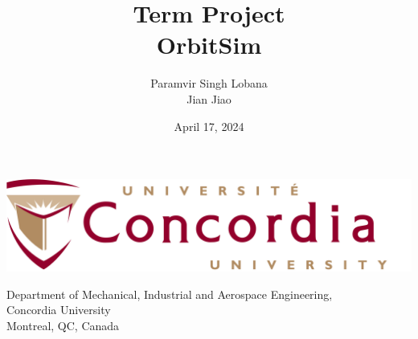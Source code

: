 \begingroup
\let\newpage\relax 
\title{Term Project\\ \Huge{\textbf{OrbitSim}}}
\vspace{200pt}
\date{April 17, 2024}
\maketitle
\thispagestyle{empty}
\endgroup 

\vspace{90pt}
\begin{center}
  \author{\vspace{10pt} Paramvir Singh Lobana \\ Jian Jiao \\ }
\end{center}
\vspace{120pt}
\begin{center}
\includegraphics[scale=0.04]{figures/logo.png}
\end{center}
\begin{center}
\large Department of Mechanical, Industrial and Aerospace Engineering, \\ Concordia University \\ Montreal, QC, Canada
\end{center}
\clearpage